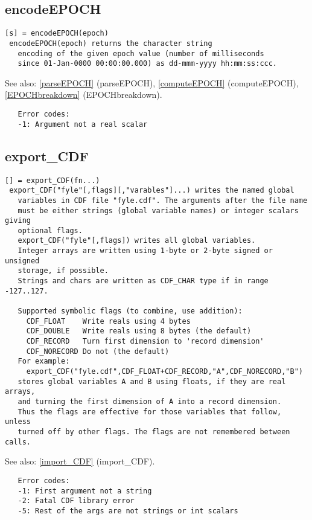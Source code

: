 \documentclass[a4paper]{article}
\begin{document}
\subsection{encodeEPOCH\label{encodeEPOCH}}

\begin{tscreen}
\begin{verbatim}
[s] = encodeEPOCH(epoch)
 encodeEPOCH(epoch) returns the character string
   encoding of the given epoch value (number of milliseconds
   since 01-Jan-0000 00:00:00.000) as dd-mmm-yyyy hh:mm:ss:ccc.
\end{verbatim}

See also: \ref{parseEPOCH} {(parseEPOCH)}, \ref{computeEPOCH} {(computeEPOCH)}, \ref{EPOCHbreakdown} {(EPOCHbreakdown)}.
\begin{verbatim}
   Error codes:
   -1: Argument not a real scalar
\end{verbatim}
\end{tscreen}



\subsection{export\_CDF\label{export_CDF}}

\begin{tscreen}
\begin{verbatim}
[] = export_CDF(fn...)
 export_CDF("fyle"[,flags][,"varables"]...) writes the named global
   variables in CDF file "fyle.cdf". The arguments after the file name
   must be either strings (global variable names) or integer scalars giving
   optional flags.
   export_CDF("fyle"[,flags]) writes all global variables.
   Integer arrays are written using 1-byte or 2-byte signed or unsigned
   storage, if possible.
   Strings and chars are written as CDF_CHAR type if in range -127..127.

   Supported symbolic flags (to combine, use addition):
     CDF_FLOAT    Write reals using 4 bytes
     CDF_DOUBLE   Write reals using 8 bytes (the default)
     CDF_RECORD   Turn first dimension to 'record dimension'
     CDF_NORECORD Do not (the default)
   For example:
     export_CDF("fyle.cdf",CDF_FLOAT+CDF_RECORD,"A",CDF_NORECORD,"B")
   stores global variables A and B using floats, if they are real arrays,
   and turning the first dimension of A into a record dimension.
   Thus the flags are effective for those variables that follow, unless
   turned off by other flags. The flags are not remembered between calls.
\end{verbatim}

See also: \ref{import_CDF} {(import\_CDF)}.
\begin{verbatim}
   Error codes:
   -1: First argument not a string
   -2: Fatal CDF library error
   -5: Rest of the args are not strings or int scalars
\end{verbatim}
\end{tscreen}
\end{document}
